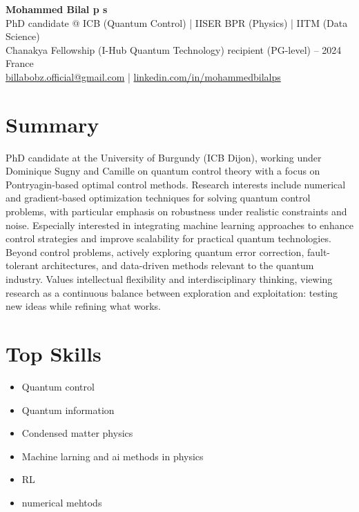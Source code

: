 \documentclass[11pt,a4paper]{article}
\begin{document}
\begin{center}
    {\LARGE \textbf{Mohammed Bilal p s}}\\[0.4em]
    PhD candidate @ ICB (Quantum Control) \;|\; IISER BPR (Physics) \;|\; IITM (Data Science) \\
    Chanakya Fellowship (I-Hub Quantum Technology) recipient (PG-level) -- 2024\\[0.6em]
    France\\
    \href{mailto:billabobz.official@gmail.com}{billabobz.official@gmail.com} \;|\;
    \href{https://www.linkedin.com/in/mohammedbilalps}{linkedin.com/in/mohammedbilalps}
\end{center}

\section*{Summary}
PhD candidate at the University of Burgundy (ICB Dijon), working under Dominique Sugny and Camille on quantum control theory with a focus on Pontryagin-based optimal control methods. Research interests include numerical and gradient-based optimization techniques for solving quantum control problems, with particular emphasis on robustness under realistic constraints and noise. Especially interested in integrating machine learning approaches to enhance control strategies and improve scalability for practical quantum technologies. Beyond control problems, actively exploring quantum error correction, fault-tolerant architectures, and data-driven methods relevant to the quantum industry. Values intellectual flexibility and interdisciplinary thinking, viewing research as a continuous balance between exploration and exploitation: testing new ideas while refining what works.

\section*{Top Skills}
\begin{itemize}[leftmargin=1.5em]
    \item Quantum control
    \item Quantum information
    \item Condensed matter physics
    \item Machine larning and ai methods in physics
    \item RL
    \item numerical mehtods
\end{itemize}
\end{document}
